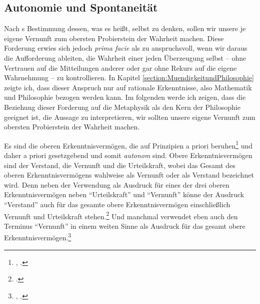 \subsection{Autonomie und Spontaneität}\label{subsection:MetaphysikundAutonomie}
Nach s Bestimmung dessen, was es heißt, selbst zu denken,
sollen wir unsere je eigene Vernunft zum obersten Probierstein der Wahrheit
machen. Diese Forderung erwies sich jedoch \emph{prima facie} als zu
anspruchsvoll, wenn wir daraus die Aufforderung ableiten, die Wahrheit einer
jeden Überzeugung selbst -- ohne Vertrauen auf die Mitteilungen anderer oder gar
ohne Rekurs auf die eigene Wahrnehmung -- zu kontrollieren. In Kapitel
\ref{section:MuendigkeitundPhilosophie} zeigte ich, dass dieser Anspruch nur auf
rationale Erkenntnisse, also Mathematik und Philosophie bezogen werden kann. Im
folgenden werde ich zeigen, dass die Beziehung dieser Forderung auf die
Metaphysik als den Kern der Philosophie geeignet ist, die Aussage zu
interpretieren, wir sollten unsere eigene Vernunft zum obersten Probierstein der
Wahrheit machen.

Es sind die oberen Erkenntnisvermögen, die auf
Prinzipien a priori beruhen\footnote{\cite[Vgl.][B 243]{Kant:KritikderUrteilskraft2009}, \cite[][V:
345.5--6]{Kant:GesammelteWerke1900ff.}.} und daher a priori gesetzgebend und
somit \emph{autonom} sind. Obere Erkenntnisvermögen sind der Verstand, die
Vernunft und die Urteilskraft, wobei das Gesamt des oberen Erkenntnisvermögens
wahlweise als Vernunft oder als Verstand bezeichnet wird. Denn neben der
 Verwendung als Ausdruck für eines der drei oberen
Erkenntnisvermögen neben \enquote{Urteilskraft} und \enquote{Vernunft} könne der
Ausdruck \enquote{Verstand} auch für das gesamte obere Erkenntnisvermögen
einschließlich Vernunft und Urteilskraft stehen.\footnote{\cite[Vgl.][BA
115\,f.,]{Kant:AnthropologieinpragmatischerHinsicht1977} \cite[][VII:
196.17--197.3]{Kant:GesammelteWerke1900ff.}.} Und manchmal verwendet
 eben auch den Terminus \enquote{Vernunft} in einem weiten
Sinne als Ausdruck für das gesamt obere
Erkenntnisvermögen.\footnote{\cite[Vgl.][B 863]{Kant:KritikderreinenVernunft2003}, \cite[][III:
540.28]{Kant:GesammelteWerke1900ff.}.}

